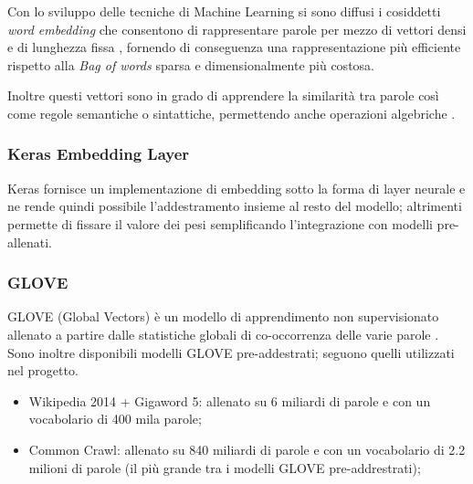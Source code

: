 Con lo sviluppo delle tecniche di Machine Learning si sono diffusi i cosiddetti
\textit{word embedding} che consentono di rappresentare parole per mezzo di
vettori densi e di lunghezza fissa \cite{almeida2019word}, fornendo di
conseguenza una rappresentazione più efficiente rispetto alla \textit{Bag of
words} sparsa e dimensionalmente più costosa.

Inoltre questi vettori sono in grado di apprendere la similarità tra parole così
come regole semantiche o sintattiche, permettendo anche operazioni algebriche
\cite{mikolov2013efficient}.

\subsubsection{Keras Embedding Layer}

Keras fornisce un implementazione di embedding sotto la forma di layer neurale
e ne rende quindi possibile l'addestramento insieme al resto del modello;
altrimenti permette di fissare il valore dei pesi semplificando l'integrazione
con modelli pre-allenati.



\subsubsection{GLOVE}
GLOVE (Global Vectors) è un modello di apprendimento non supervisionato allenato
a partire dalle statistiche globali di co-occorrenza delle varie parole
\cite{pennington2014glove}. Sono inoltre disponibili modelli GLOVE
pre-addestrati; seguono quelli utilizzati nel progetto.
\begin{itemize}
	\item Wikipedia 2014 + Gigaword 5: allenato su 6 miliardi di parole e con un
	vocabolario di 400 mila parole;
	\item Common Crawl: allenato su 840 miliardi di parole e con un vocabolario
	di 2.2 milioni di parole (il più grande tra i modelli GLOVE pre-addrestrati);
\end{itemize}

